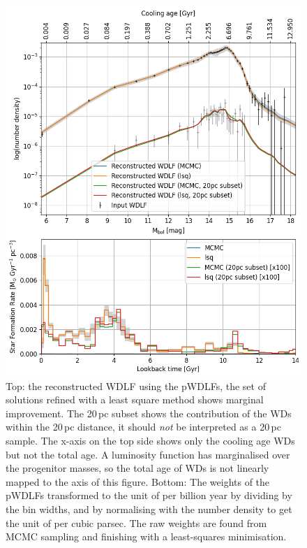 \documentclass[fleqn,usenatbib]{mnras}
\begin{document}
\begin{figure}
    \includegraphics[width=
    \columnwidth]{figures/fig_05_gcns_reconstructed_wdlf_optimal_resolution_bin_optimal.png}
    \caption{Top: the reconstructed WDLF using the pWDLFs, the set of solutions
    refined with a least square method shows marginal improvement. The 20\,pc
    subset shows the contribution of the WDs within the 20\,pc distance, it
    should \textit{not} be interpreted as a 20\,pc sample. The x-axis on
    the top side shows only the cooling age WDs but not the total age. A
    luminosity function has marginalised over the progenitor masses, so the total
    age of WDs is not linearly mapped to the axis of this figure. Bottom: The
    weights of the pWDLFs transformed to the unit of per billion year by dividing
    by the bin widths, and by normalising with the number density to get the
    unit of per cubic parsec. The raw weights are found from MCMC sampling
    and finishing with a least-squares minimisation.}
    \label{fig:sfh_optimal}
\end{figure}
\end{document}

